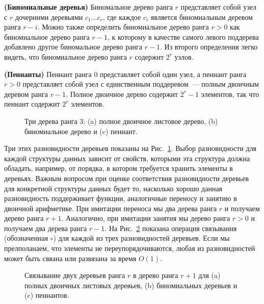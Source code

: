 \begin{definition}
  \textbf{(Биномиальные деревья)} Биномальное дерево ранга $r$
  представляет собой узел с $r$ дочерними деревьями $c_1 \ldots c_r$,
  где каждое $c_i$ является биномиальным деревом ранга $r -
  i$. Можно также определить биномиальное дерево ранга $r > 0$ как
  биномиальное дерево ранга $r - 1$, к которому в качестве самого
  левого поддерева добавлено другое биномальное дерево ранга $r -
  1$. Из второго определения легко видеть, что биномиальное дерево
  ранга $r$ содержит $2^r$ узлов.
\end{definition}

\begin{definition}
  \textbf{(Пеннанты)} Пеннант ранга 0 представляет собой один узел, а
  пеннант ранга $r > 0$ представляет собой узел с единственным
  поддеревом~--- полным двоичным деревом ранга $r - 1$. Полное
  двоичное дерево содержит $2^r - 1$ элементов, так что пеннант
  содержит $2^r$ элементов.
\end{definition}

\begin{figure}
  \centering
  
  \caption{Три дерева ранга 3: (a) полное двоичное листовое дерево, (b) биномиальное дерево и (c) пеннант.}
  \label{fig:9.2}
\end{figure}

Три этих разновидности деревьев показаны на
Рис.~\ref{fig:9.2}. Выбор разновидности для каждой структуры данных
зависит от свойств, которыми эта структура должна обладать, например,
от порядка, в котором требуется хранить элементы в деревьях. Важным
вопросом при оценке соответствия разновидности деревьев для конкретной
структуры данных будет то, насколько хорошо данная разновидность
поддерживает функции, аналогичные переносу и занятию в двоичной
арифметике. При имитации переноса мы  два дерева
ранга $r$ и получаем дерево ранга $r+1$. Аналогично, при имитации
занятия мы  дерево ранга $r > 0$ и получаем
два дерева ранга $r-1$. На Рис.~\ref{fig:9.3} показана операция
связывания (обозначенная $\circ$) %
для каждой из трех разновидностей деревьев. Если мы прелполанаем, что
элементы не переупорядочиваются, любая из разновидностей может быть
свяана или развязана за время $O(1)$.

\begin{figure}
  \centering
  
  \caption{Связывание двух деревьев ранга $r$ в дерево ранга $r+1$ для (a) полных двоичных листовых деревьев, (b) биномиальных деревьев и (c) пеннантов.}
  \label{fig:9.3}
\end{figure}

